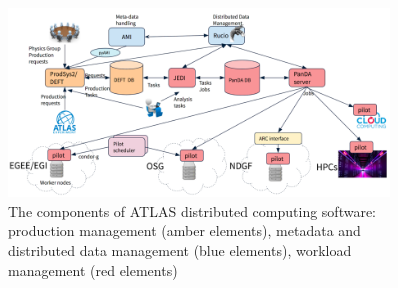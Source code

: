 \documentclass{webofc}
\begin{document}
\begin{itemize}
	
	
	
	
	
\end{itemize}

\begin{figure}
	\centering
	\includegraphics[width=0.90\textwidth]{figures/PanDA_architecture.png}
    \caption{The components of ATLAS distributed computing software: production management (amber elements), metadata and distributed data management (blue elements), workload management (red elements)}	
	\label{fig:panda-arch}
\end{figure}
\end{document}
